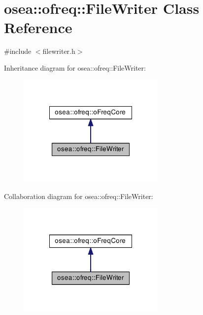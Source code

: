 \hypertarget{classosea_1_1ofreq_1_1_file_writer}{\section{osea\-:\-:ofreq\-:\-:File\-Writer Class Reference}
\label{classosea_1_1ofreq_1_1_file_writer}
}


{\ttfamily \#include $<$filewriter.\-h$>$}



Inheritance diagram for osea\-:\-:ofreq\-:\-:File\-Writer\-:\nopagebreak
\begin{figure}[H]
\begin{center}
\leavevmode
\includegraphics[width=204pt]{classosea_1_1ofreq_1_1_file_writer__inherit__graph}
\end{center}
\end{figure}


Collaboration diagram for osea\-:\-:ofreq\-:\-:File\-Writer\-:\nopagebreak
\begin{figure}[H]
\begin{center}
\leavevmode
\includegraphics[width=204pt]{classosea_1_1ofreq_1_1_file_writer__coll__graph}
\end{center}
\end{figure}
